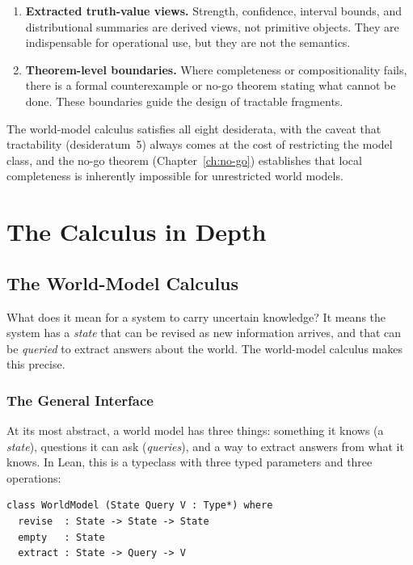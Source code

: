 \documentclass[11pt,openany]{report}
\begin{document}
\begin{enumerate}
\item \textbf{Extracted truth-value views.}  Strength, confidence,
  interval bounds, and distributional summaries are derived views, not
  primitive objects.  They are indispensable for operational use, but
  they are not the semantics.

\item \textbf{Theorem-level boundaries.}  Where completeness or
  compositionality fails, there is a formal counterexample or no-go
  theorem stating what cannot be done.  These boundaries guide the
  design of tractable fragments.
\end{enumerate}

\noindent
The world-model calculus satisfies all eight desiderata, with the
caveat that tractability (desideratum~5) always comes at the cost of
restricting the model class, and the no-go theorem
(Chapter~\ref{ch:no-go}) establishes that local completeness is
inherently impossible for unrestricted world models.


\part{The Calculus in Depth}
\label{part:calculus}

\chapter{The World-Model Calculus}
\label{ch:world-models}

What does it mean for a system to carry uncertain knowledge?  It means
the system has a \emph{state} that can be revised as new information
arrives, and that can be \emph{queried} to extract answers about the
world.  The world-model calculus makes this precise.

\section{The General Interface}

At its most abstract, a world model has three things: something it
knows (a \emph{state}), questions it can ask (\emph{queries}), and a
way to extract answers from what it knows.  In Lean, this is a
typeclass with three typed parameters and three operations:

\begin{lstlisting}[language={}]
class WorldModel (State Query V : Type*) where
  revise  : State -> State -> State
  empty   : State
  extract : State -> Query -> V
\end{lstlisting}
\end{document}
